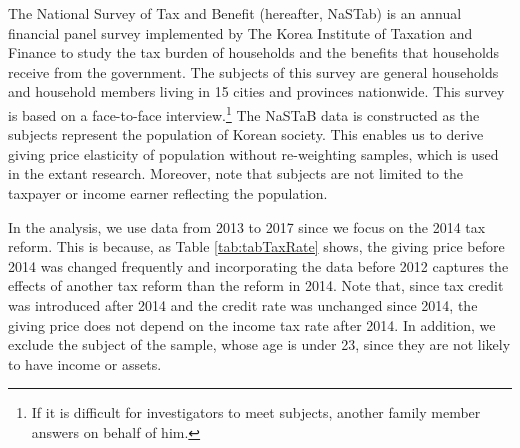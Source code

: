 \documentclass[
  11pt,
  a4paper,
]{article}
\begin{document}
The National Survey of Tax and Benefit (hereafter, NaSTab) is
an annual financial panel survey
implemented by The Korea Institute of Taxation and Finance
to study the tax burden of households and the benefits
that households receive from the government.
The subjects of this survey are general households and
household members living in 15 cities and provinces nationwide.
This survey is based on a face-to-face interview.\footnote{If it is difficult for investigators to meet subjects, another family member answers on behalf of him.}
The NaSTaB data is constructed
as the subjects represent the population of Korean society.
This enables us to derive giving price elasticity of population
without re-weighting samples, which is used in the extant research.
Moreover, note that subjects are not limited to the taxpayer or
income earner reflecting the population.

In the analysis,
we use data from 2013 to 2017 since we focus on the 2014 tax reform.
This is because, as Table \ref{tab:tabTaxRate} shows,
the giving price before 2014 was changed frequently
and incorporating the data before 2012
captures the effects of another tax reform than the reform in 2014.
Note that, since tax credit was introduced after 2014 and
the credit rate was unchanged since 2014,
the giving price does not depend on the income tax rate after 2014.
In addition, we exclude the subject of the sample, whose age is under 23,
since they are not likely to have income or assets.
\end{document}
